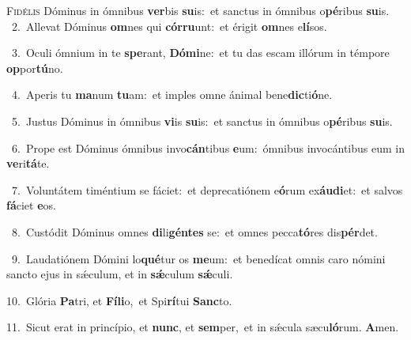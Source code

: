 \lettrine{\initial\textcolor{\initialcolor}{F}}{idélis} Dóminus in ómnibus \textbf{ver}\-bis \textbf{su}\-is:~\star et sanctus in ómnibus o\-\textbf{pé}\-ribus \textbf{su}\-is.\\
{\numbfont\textcolor{\numbcolor}{~2.}}~Allevat Dóminus \textbf{om}\-nes qui \textbf{cór}\-\textbf{ru}unt:~\star et érigit \textbf{om}\-nes e\-\textbf{lí}\-sos.\par
{\numbfont\textcolor{\numbcolor}{~3.}}~Oculi ómnium in te \textbf{spe}\-rant, \textbf{Dó}\-\textbf{mi}ne:~\star et tu das escam illórum in témpore \textbf{op}\-por\-\textbf{tú}\-no.\par
{\numbfont\textcolor{\numbcolor}{~4.}}~Aperis tu \textbf{ma}\-num \textbf{tu}\-am:~\star et imples omne ánimal bene\-\textbf{dic}\-ti\-\textbf{ó}\-ne.\par
{\numbfont\textcolor{\numbcolor}{~5.}}~Justus Dóminus in ómnibus \textbf{vi}\-is \textbf{su}\-is:~\star et sanctus in ómnibus o\-\textbf{pé}\-ribus \textbf{su}\-is.\par
{\numbfont\textcolor{\numbcolor}{~6.}}~Prope est Dóminus ómnibus invo\-\textbf{cán}\-tibus \textbf{e}\-um:~\star ómnibus invocántibus eum in \textbf{ve}\-ri\-\textbf{tá}\-te.\par
{\numbfont\textcolor{\numbcolor}{~7.}}~Voluntátem timéntium se fáciet:~\dagger et deprecatiónem e\-\textbf{ó}\-rum ex\-\textbf{áu}\-\textbf{di}et:~\star et salvos \textbf{fá}\-ciet \textbf{e}\-os.\par
{\numbfont\textcolor{\numbcolor}{~8.}}~Custódit Dóminus omnes \textbf{di}\-li\-\textbf{gén}\-\textbf{tes} se:~\star et omnes pecca\-\textbf{tó}\-res dis\-\textbf{pér}\-det.\par
{\numbfont\textcolor{\numbcolor}{~9.}}~Laudatiónem Dómini lo\-\textbf{qué}\-tur os \textbf{me}\-um:~\star et benedícat omnis caro nómini sancto ejus in sǽculum, et in \textbf{sǽ}\-culum \textbf{sǽ}\-culi.\par
{\numbfont\textcolor{\numbcolor}{10.}}~Glória \textbf{Pa}\-tri, et \textbf{Fí}\-\textbf{li}o,~\star et Spi\-\textbf{rí}\-tui \textbf{Sanc}\-to.\par
{\numbfont\textcolor{\numbcolor}{11.}}~Sicut erat in princípio, et \textbf{nunc}\-, et \textbf{sem}\-per,~\star et in sǽcula sæcu\-\textbf{ló}\-rum. \textbf{A}\-men.\par
